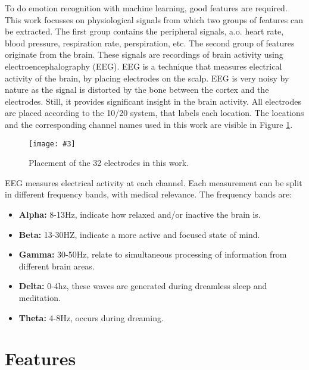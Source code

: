 \documentclass[11pt,journal,compsoc]{IEEEtran}
\newcommand{\npar}{\par \vspace{2.3ex plus 0.3ex minus 0.3ex}}
\newcommand{\mijnfiguur}[4][H]{            %
    \begin{figure}[#1]                      %
        \begin{center}                      %
            \texttt{[image: \#3]}        %
            \caption{#4\label{#3}}          %
        \end{center}
    \end{figure}
    }
\begin{document}
\npar

To do emotion recognition with machine learning, good features are required. This work focusses on physiological signals from which two groups of features can be extracted. The first group contains the peripheral signals, a.o. heart rate, blood pressure, respiration rate, perspiration, etc. The second group of features originate from the brain. These signals are recordings of brain activity using electroencephalography (EEG). EEG is a technique that measures electrical activity of the brain, by placing electrodes on the scalp\cite{ExtendedPaper}. EEG is very noisy by nature as the signal is distorted by the bone between the cortex and the electrodes. Still, it provides significant insight in the brain activity\cite{GivenPaper}. All electrodes are placed according to the 10/20 system, that labels each location. The locations and the corresponding channel names used in this work are visible in Figure \ref{1020labels}.

\mijnfiguur{width=0.5\textwidth}{1020labels}{Placement of the 32 electrodes in this work.\cite{1020Site}}

EEG measures electrical activity at each channel. Each measurement can be split in different frequency bands, with medical relevance\cite{EmotionRelativePower,WavesSite}. The frequency bands are:
\begin{itemize}
\item \textbf{Alpha:} 8-13Hz, indicate how relaxed and/or inactive the brain is.
\item \textbf{Beta:} 13-30HZ, indicate a more active and focused state of mind.
\item \textbf{Gamma:} 30-50Hz, relate to simultaneous processing of information from different brain areas.
\item \textbf{Delta:} 0-4hz, these waves are generated during dreamless sleep and meditation.
\item \textbf{Theta:} 4-8Hz, occurs during dreaming.
\end{itemize}

\section{Features} \label{features}
\end{document}
